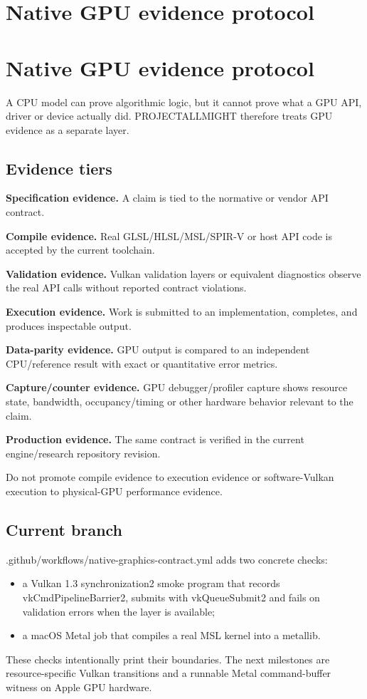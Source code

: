 \hypertarget{appendix-1680333ac796}{}
\section*{Native GPU evidence protocol}
\section{Native GPU evidence protocol}\label{native-gpu-evidence-protocol}

A CPU model can prove algorithmic logic, but it cannot prove what a GPU API, driver or device actually did. PROJECTALLMIGHT therefore treats GPU evidence as a separate layer.

\subsection{Evidence tiers}\label{evidence-tiers}

\textbf{Specification evidence.} A claim is tied to the normative or vendor API contract.

\textbf{Compile evidence.} Real GLSL/HLSL/MSL/SPIR-V or host API code is accepted by the current toolchain.

\textbf{Validation evidence.} Vulkan validation layers or equivalent diagnostics observe the real API calls without reported contract violations.

\textbf{Execution evidence.} Work is submitted to an implementation, completes, and produces inspectable output.

\textbf{Data-parity evidence.} GPU output is compared to an independent CPU/reference result with exact or quantitative error metrics.

\textbf{Capture/counter evidence.} GPU debugger/profiler capture shows resource state, bandwidth, occupancy/timing or other hardware behavior relevant to the claim.

\textbf{Production evidence.} The same contract is verified in the current engine/research repository revision.

Do not promote compile evidence to execution evidence or software-Vulkan execution to physical-GPU performance evidence.

\subsection{Current branch}\label{current-branch}

.github/workflows/native-graphics-contract.yml adds two concrete checks:

\begin{itemize}
\tightlist
\item
  a Vulkan 1.3 synchronization2 smoke program that records vkCmdPipelineBarrier2, submits with vkQueueSubmit2 and fails on validation errors when the layer is available;
\item
  a macOS Metal job that compiles a real MSL kernel into a metallib.
\end{itemize}

These checks intentionally print their boundaries. The next milestones are resource-specific Vulkan transitions and a runnable Metal command-buffer witness on Apple GPU hardware.
